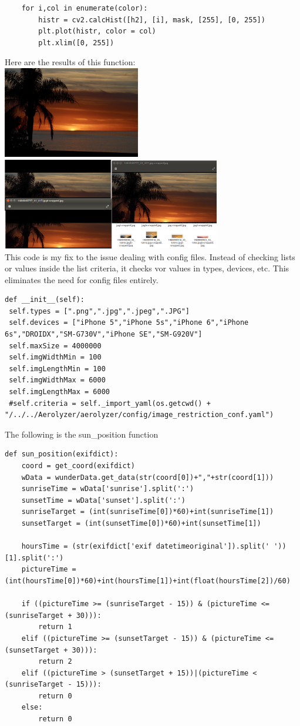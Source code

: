 \documentclass[onecolumn, draftclsnofoot,10pt, compsoc]{IEEEtran}
\begin{document}
\begin{singlespace}
\begin{lstlisting}
	for i,col in enumerate(color):
		histr = cv2.calcHist([h2], [i], mask, [255], [0, 255])
		plt.plot(histr, color = col)
		plt.xlim([0, 255])
			\end{lstlisting}	
			Here are the results of this function:\\
			\includegraphics[height=4cm,natwidth=640,natheight=426]{images/horizon_uncropped.jpg}\\
			\includegraphics[height=4cm,natwidth=1281,natheight=537]{images/horizon_cropped.png}\\
			
			This code is my fix to the issue dealing with config files. 
			Instead of checking lists or values inside the list criteria, it checks vor values in types, devices, etc.
			This eliminates the need for config files entirely.
			\begin{lstlisting}
def __init__(self):
 self.types = [".png",".jpg",".jpeg",".JPG"]
 self.devices = ["iPhone 5","iPhone 5s","iPhone 6","iPhone 6s","DROIDX","SM-G730V","iPhone SE","SM-G920V"]
 self.maxSize = 4000000
 self.imgWidthMin = 100
 self.imgLengthMin = 100
 self.imgWidthMax = 6000
 self.imgLengthMax = 6000
 #self.criteria = self._import_yaml(os.getcwd() + "/../../Aerolyzer/aerolyzer/config/image_restriction_conf.yaml")
			\end{lstlisting}

			The following is the sun\_position function
			\begin{lstlisting}
def sun_position(exifdict):
	coord = get_coord(exifdict)
	wData = wunderData.get_data(str(coord[0])+","+str(coord[1]))
	sunriseTime = wData['sunrise'].split(':')
	sunsetTime = wData['sunset'].split(':')
	sunriseTarget = (int(sunriseTime[0])*60)+int(sunriseTime[1])
	sunsetTarget = (int(sunsetTime[0])*60)+int(sunsetTime[1])

	hoursTime = (str(exifdict['exif datetimeoriginal']).split(' '))[1].split(':')
	pictureTime = (int(hoursTime[0])*60)+int(hoursTime[1])+int(float(hoursTime[2])/60)

	if ((pictureTime >= (sunriseTarget - 15)) & (pictureTime <= (sunriseTarget + 30))):
		return 1
	elif ((pictureTime >= (sunsetTarget - 15)) & (pictureTime <= (sunsetTarget + 30))):
		return 2
	elif ((pictureTime > (sunsetTarget + 15))|(pictureTime < (sunriseTarget - 15))):
		return 0
	else:
		return 0
			\end{lstlisting}
\end{singlespace}
\clearpage


\end{document}
